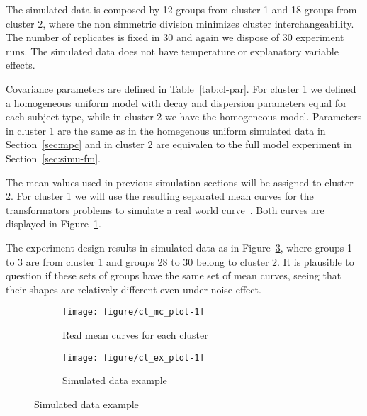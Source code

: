 The simulated data is composed by 12 groups from cluster 1 and 18 groups from cluster 2, where the non simmetric division minimizes cluster interchangeability. The number of replicates is fixed in 30 and again we dispose of 30 experiment runs. The simulated data does not have temperature or explanatory variable effects.


Covariance parameters are defined in Table~\ref{tab:cl-par}. For cluster 1 we defined a homogeneous uniform model with decay and dispersion parameters equal for each subject type, while in cluster 2 we have the homogeneous model. Parameters in cluster 1 are the same as in the homegenous uniform simulated data in Section~\ref{sec:mpc} and in cluster 2 are equivalen to the full model experiment in Section~\ref{sec:simu-fm}.


The mean values used in previous simulation sections will be assigned to cluster 2. For cluster 1 we will use the resulting separated mean curves for the transformators problems to simulate a real world curve~\cite{dias2009non}. Both curves are displayed in Figure~\ref{fig:cl-mc}.

The experiment design results in simulated data as in Figure~\ref{fig:cl-simudata}, where groups 1 to 3 are from cluster 1 and groups 28 to 30 belong to cluster 2. It is plausible to question if these sets of groups have the same set of mean curves, seeing that their shapes are relatively different even under noise effect.

\begin{figure}[t]
  \begin{subfigure}{\textwidth}
  \centering
\begin{knitrout}
\color{fgcolor}
\texttt{[image: figure/cl\_mc\_plot-1]} 

\end{knitrout}
  \caption{Real mean curves for each cluster}
  \label{fig:cl-mc}
\end{subfigure}
\begin{subfigure}{\textwidth}
  \centering
\begin{knitrout}
\color{fgcolor}
\texttt{[image: figure/cl\_ex\_plot-1]} 

\end{knitrout}
  \caption{Simulated data example}
  \label{fig:cl-simudata}
\end{subfigure}
\end{figure}

